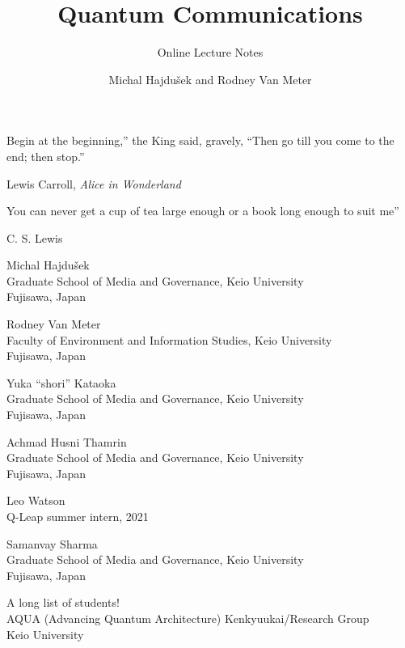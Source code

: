\documentclass[6x9]{newmath}
\title{Quantum Communications}
\subtitle{Online Lecture Notes}
\author{Michal Hajdu\v{s}ek and Rodney Van Meter}
\begin{document}
\halftitlepage


\titlepage

\begin{copyrightpage}
\doclicenseThis%

\end{copyrightpage}

\dedication{I'd like to thank the Academy...} 

\begin{epigraphpage}
\epigraph{Begin at the beginning,'' the King said, gravely, ``Then
go till you come to the end; then stop.''}{Lewis Carroll, {\it Alice
in Wonderland}}

\epigraph{You can never get a cup of tea large enough or a book long enough to
suit me''}{C. S. Lewis}
\end{epigraphpage}

\tableofcontents
\listoffigures

\begin{contributors}[twocolumn]

\contrib 
Michal Hajdu\v{s}ek\\
Graduate School of Media and Governance, Keio University\\
Fujisawa, Japan

\contrib 
Rodney Van Meter\\
Faculty of Environment and Information Studies, Keio University\\
Fujisawa, Japan

\contrib
Yuka ``shori'' Kataoka\\
Graduate School of Media and Governance, Keio University\\
Fujisawa, Japan

\contrib
Achmad Husni Thamrin\\
Graduate School of Media and Governance, Keio University\\
Fujisawa, Japan

\contrib
Leo Watson\\
Q-Leap summer intern, 2021

\contrib
Samanvay Sharma\\
Graduate School of Media and Governance, Keio University\\
Fujisawa, Japan

\contrib 
A long list of students!\\
AQUA (Advancing Quantum Architecture) Kenkyuukai/Research Group\\
Keio University
\end{contributors}
\end{document}

